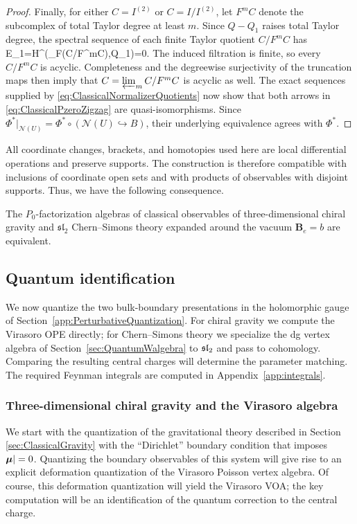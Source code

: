 \documentclass[11pt]{amsart}
\numberwithin{equation}{section}
\numberwithin{figure}{section}
\numberwithin{table}{section}
\begin{document}
\begin{proof}
	Finally, for either $C=I^{(2)}$ or $C=I/I^{(2)}$, let $F^mC$ denote the subcomplex of total Taylor degree at least $m$.
	Since $Q-Q_1$ raises total Taylor degree, the spectral sequence of each finite Taylor quotient $C/F^mC$ has
	\be
	E_1=H^\bullet\big(_F(C/F^mC),Q_1\big)=0.
	\ee
	The induced filtration is finite, so every $C/F^mC$ is acyclic.
	Completeness and the degreewise surjectivity of the truncation maps then imply that $C=\varprojlim_m C/F^mC$ is acyclic as well.
	The exact sequences supplied by \eqref{eq:ClassicalNormalizerQuotients} now show that both arrows in \eqref{eq:ClassicalPzeroZigzag} are quasi-isomorphisms.
	Since $\Phi^*|_{\mathcal N(U)}=\Phi^*\circ(\mathcal N(U)\hookrightarrow B)$, their underlying equivalence agrees with $\Phi^*$.
\end{proof}

All coordinate changes, brackets, and homotopies used here are local differential operations and preserve supports.
The construction is therefore compatible with inclusions of coordinate open sets and with products of observables with disjoint supports.
Thus, we have the following consequence.
\begin{cor}[]
	\label{cor:cs=g_classical}
	The $P_0$-factorization algebras of classical observables of three-dimensional chiral gravity and
	$\mathfrak{sl}_2$
	Chern--Simons theory expanded around the vacuum $\mathbf B_e = b$ are equivalent.
\end{cor}

\subsection{Quantum identification}\label{sec:QuantumBCs}
We now quantize the two bulk-boundary presentations in the holomorphic gauge of Section~\ref{app:PerturbativeQuantization}.
For chiral gravity we compute the Virasoro OPE directly; for Chern--Simons theory we specialize the dg vertex algebra of Section~\ref{sec:QuantumWalgebra} to $\mathfrak{sl}_2$ and pass to cohomology.
Comparing the resulting central charges will determine the parameter matching.
The required Feynman integrals are computed in Appendix~\ref{app:integrals}.

\subsubsection{Three-dimensional chiral gravity and the Virasoro algebra}\label{sec:Virasoro}

We start with the quantization of the gravitational theory described in Section \ref{sec:ClassicalGravity} with the \enquote{Dirichlet} boundary condition that imposes $\boldsymbol{\mu}| = 0$.
Quantizing the boundary observables of this system will give rise to an explicit deformation quantization of the Virasoro Poisson vertex algebra.
Of course, this deformation quantization will yield the Virasoro VOA; the key computation will be an identification of the quantum correction to the central charge.
\end{document}
